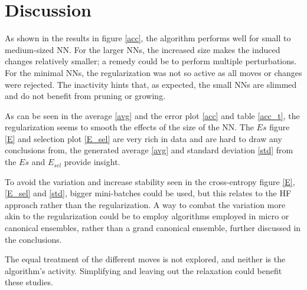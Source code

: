 \chapter{Discussion}

As shown in the results in figure \ref{acc}, the algorithm performs well for small to medium-sized NN. For the larger NNs, the increased size makes the induced changes relatively smaller; a remedy could be to perform multiple perturbations. For the minimal NNs, the regularization was not so active as all moves or changes were rejected. The inactivity hints that, as expected, the small NNs are slimmed and do not benefit from pruning or growing. 

As can be seen in the average \ref{avg} and the error plot \ref{acc} and table \ref{acc_t}, the regularization seems to smooth the effects of the size of the NN. The $Es$ figure \ref{E} and selection plot \ref{E_sel} are very rich in data and are hard to draw any conclusions from, the generated average \ref{avg} and standard deviation \ref{std} from the $Es$ and $E_{sel}$ provide insight. 

To avoid the variation and increase stability seen in the cross-entropy figure \ref{E}, \ref{E_sel} and \ref{std}, bigger mini-batches could be used, but this relates to the HF approach rather than the regularization. A way to combat the variation more akin to the regularization could be to employ algorithms employed in micro or canonical ensembles, rather than a grand canonical ensemble, further discussed in the conclusions.

The equal treatment of the different moves is not explored, and neither is the algorithm's activity. Simplifying and leaving out the relaxation could benefit these studies. 